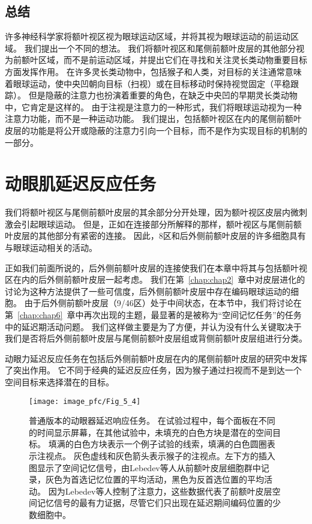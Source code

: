 \subsection{总结}

许多神经科学家将额叶视区视为眼球运动区域，并将其视为眼球运动的前运动区域。
我们提出一个不同的想法。
我们将额叶视区和尾侧前额叶皮层的其他部分视为前额叶区域，而不是前运动区域，并提出它们在寻找和关注灵长类动物重要目标方面发挥作用。
在许多灵长类动物中，包括猴子和人类，对目标的关注通常意味着眼球运动，使中央凹朝向目标（扫视）或在目标移动时保持视觉固定（平稳跟踪）。
但是隐蔽的注意力也扮演着重要的角色，在缺乏中央凹的早期灵长类动物中，它肯定是这样的。
由于注视是注意力的一种形式，我们将眼球运动视为一种注意力功能，而不是一种运动功能。
我们提出，包括额叶视区在内的尾侧前额叶皮层的功能是将公开或隐蔽的注意力引向一个目标，而不是作为实现目标的机制的一部分。



\section{动眼肌延迟反应任务}

我们将额叶视区与尾侧前额叶皮层的其余部分分开处理，因为额叶视区皮层内微刺激会引起眼球运动。
但是，正如在连接部分所解释的那样，额叶视区与尾侧前额叶皮层的其他部分有紧密的连接。
因此，8区\cite{chafee1998matching}和后外侧前额叶皮层\cite{funahashi1989mnemonic}的许多细胞具有与眼球运动相关的活动。


正如我们前面所说的，后外侧前额叶皮层的连接使我们在本章中将其与包括额叶视区在内的后外侧前额叶皮层一起考虑。
我们在第~\ref{chap:chap2}~章中对皮层进化的讨论为这种方法提供了一些可信度，后外侧前额叶皮层中存在编码眼球运动的细胞。
由于后外侧前额叶皮层（9/46区）处于中间状态，在本节中，我们将讨论在第~\ref{chap:chap6}~章中再次出现的主题，最显著的是被称为“空间记忆任务”的任务中的延迟期活动问题。
我们这样做主要是为了方便，并认为没有什么关键取决于我们是否将后外侧前额叶皮层与尾侧前额叶皮层组或背侧前额叶皮层组进行分类。


动眼力延迟反应任务在包括后外侧前额叶皮层在内的尾侧前额叶皮层的研究中发挥了突出作用。
它不同于经典的延迟反应任务，因为猴子通过扫视而不是到达一个空间目标来选择潜在的目标。


\begin{figure}
	\centering
	\texttt{[image: image\_pfc/Fig\_5\_4]}
	\caption{普通版本的动眼器延迟响应任务。
		在试验过程中，每个面板在不同的时间显示屏幕，在其他试验中，未填充的白色方块是潜在的空间目标。
		填满的白色方块表示一个例子试验的线索，填满的白色圆圈表示注视点。
		灰色虚线和灰色箭头表示猴子的注视点。左下方的插入图显示了空间记忆信号，由Lebedev等人\cite{lebedev2004representation}从前额叶皮层细胞群中记录，灰色为首选记忆位置的平均活动，黑色为反首选位置的平均活动。
		因为Lebedev等人控制了注意力，这些数据代表了前额叶皮层空间记忆信号的最有力证据，尽管它们只出现在延迟期间编码位置的少数细胞中。}
	\label{fig:fig_5_4}
\end{figure}


